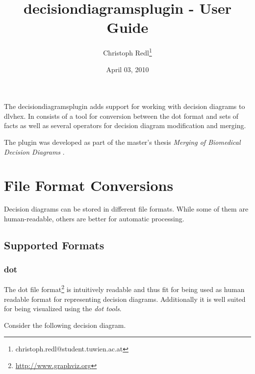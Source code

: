 \documentclass[a4paper,11pt]{article}
\theoremstyle{definition}
\newcommand{\dlvhex}{\textsf{dlvhex}\xspace }
\newcommand{\dotff}{\textsf{dot}\xspace }
\newcommand{\DrawDD}
	{
		\tikzset{edge from parent/.style=
		  {draw,
		  ->,
		   edge from parent path={(\tikzparentnode) -- (\tikzchildnode)}}} 
		\tikzset{every node/.style={draw, rectangle, rounded corners=1mm, minimum width=1cm}}
		\tikzset{every leaf node/.style={draw, rectangle, rounded corners=0mm}}
		\tikzset{level distance=1.2cm}
		\tikzset{el/.style={auto,draw=none}}	%
	}
\begin{document}
	\title{decisiondiagramsplugin - User Guide}
	\date{April 03, 2010}
	\author{Christoph Redl\footnote{christoph.redl@student.tuwien.ac.at}}
	\maketitle

	The decisiondiagramsplugin adds support for working with decision diagrams to \dlvhex. In consists of a tool for conversion between the \dotff format and sets of facts as well as
	several operators for decision diagram modification and merging.
	
	The plugin was developed as part of the master's thesis \emph{Merging of Biomedical Decision Diagrams} \cite{CR10DD}.

	
	\section{File Format Conversions}
	\label{sec:Conversion}

		Decision diagrams can be stored in different file formats. While some of them are human-readable, others are better for automatic processing.
		
		\subsection{Supported Formats}

			\subsubsection{\dotff}

				The \dotff file format\footnote{\url{http://www.graphviz.org}} is intuitively readable and thus fit for being used as human readable format for representing decision diagrams.
				Additionally it is well suited for being visualized using the \emph{\dotff tools}.
			
				Consider the following decision diagram.
				
				\begin{minipage}[t]{1.00\textwidth}
					\label{fig:DecisionDiagram}
					\center
				\end{minipage}
				
\end{document}

